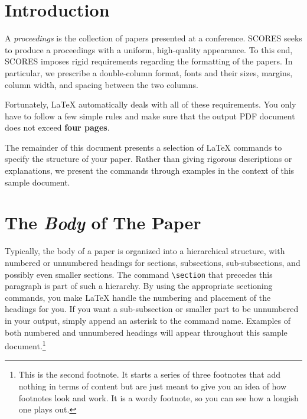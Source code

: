 \documentclass[sigconf]{acmart}
\newcommand{\scores}{\textsc{SCORES}}
\begin{document}

\maketitle

\section{Introduction}

A \emph{proceedings} is the collection of papers presented at a conference.
\scores{} seeks to produce a proceedings with a uniform, high-quality
appearance.  To this end, \scores{} imposes rigid requirements regarding the
formatting of the papers.  In particular, we prescribe a double-column format,
fonts and their sizes, margins, column width, and spacing between the two
columns.

Fortunately, \LaTeX{} automatically deals with all of these requirements.  You
only have to follow a few simple rules and make sure that the output PDF
document does not exceed \textbf{four pages}.

The remainder of this document presents a selection of \LaTeX{} commands to
specify the structure of your paper.  Rather than giving rigorous descriptions
or explanations, we present the commands through examples in the context of
this sample document.

\section{The \emph{Body} of The Paper}

Typically, the body of a paper is organized into a hierarchical structure,
with numbered or unnumbered headings for sections, subsections,
sub-subsections, and possibly even smaller sections.  The command
\texttt{\textbackslash{}section} that precedes this paragraph is part of such
a hierarchy.  By using the appropriate sectioning commands, you make \LaTeX{}
handle the numbering and placement of the headings for you.  If you want a
sub-subsection or smaller part to be unnumbered in your output, simply append
an asterisk to the command name.  Examples of both numbered and unnumbered
headings will appear throughout this sample document.\footnote{This is the
second footnote. It starts a series of three footnotes that add nothing in
terms of content but are just meant to give you an idea of how footnotes look
and work. It is a wordy footnote, so you can see how a longish one plays
out.}
\end{document}
